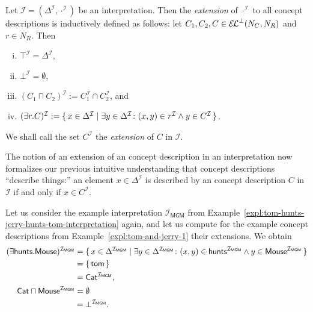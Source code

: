 \begin{Definition}[Extensions]
  \label{def:extending-the-interpretation-function}
  Let $\mathcal{I} = (\Delta^{\mathcal{I}}, \cdot^{\mathcal{I}})$ be an interpretation.
  Then the \emph{extension} of $\cdot^{\mathcal{I}}$ to all \ELbot concept descriptions is
  inductively defined as follows: let $C_1, C_2, C \in {\ensuremath{{\mathcal{E}\kern-.3ex\mathcal{L}}^\bot}}(N_C, N_R)$ and $r \in N_R$.
  Then
  \begin{enumerate}[i. ]
  \item $\top^{\mathcal{I}} = \Delta^{\mathcal{I}}$,
  \item $\bot^{\mathcal{I}} = \emptyset$,
  \item $(C_1 \sqcap C_2)^{\mathcal{I}} := C_1^{\mathcal{I}} \cap C_2^{\mathcal{I}}$, and
  \item $(\exists r. C)^{\mathcal{I}} := {\{\, x \in \Delta^{\mathcal{I}} \mid \exists y
      \in \Delta^{\mathcal{I}} \colon (x, y) \in r^{\mathcal{I}} \land y \in C^{\mathcal{I}} \,\}}$.
  \end{enumerate}
  We shall call the set $C^{\mathcal{I}}$ the \emph{extension} of $C$ in $\mathcal{I}$.
\end{Definition}

The notion of an extension of an \ELbot concept description in an interpretation now
formalizes our previous intuitive understanding that concept descriptions ``describe
things:'' an element $x \in \Delta^{\mathcal{I}}$ is described by an \ELbot concept
description $C$ in $\mathcal{I}$ if and only if $x \in C^{\mathcal{I}}$.

\begin{Example}
  \label{expl:tom-and-jerry-2}
  Let us consider the example interpretation $\mathcal{I}_{\mathsf{MGM}}$ from
  Example~\ref{expl:tom-hunts-jerry-hunts-tom-interpretation} again, and let us compute
  for the example \ELbot concept descriptions from Example~\ref{expl:tom-and-jerry-1}
  their extensions.  We obtain
  \begin{align*}
    (\mathsf{\exists hunts. Mouse})^{\mathcal{I}_{\mathsf{MGM}}} &= {\{\, x \in
      \Delta^{\mathcal{I}_{\mathsf{MGM}}} \mid \exists y \in
      \Delta^{\mathcal{I}_{\mathsf{MGM}}} \colon (x, y) \in
      \mathsf{hunts}^{\mathcal{I}_{\mathsf{MGM}}} \land y \in
      \mathsf{Mouse}^{\mathcal{I}_{\mathsf{MGM}}} \,\}}\\
    &= {\{\, \mathsf{tom} \,\}} \\
    &= \mathsf{Cat}^{\mathcal{I}_{\mathsf{MGM}}},\\
    \mathsf{Cat \sqcap Mouse}^{\mathcal{I}_{\mathsf{MGM}}} &= \emptyset \\
    &= \bot^{\mathcal{I}_{\mathsf{MGM}}}.
  \end{align*}
\end{Example}

